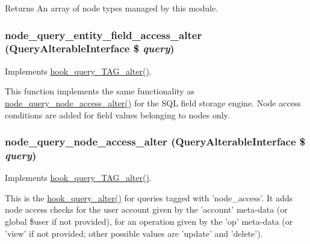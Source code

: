 \begin{DoxyReturn}{Returns}
An array of node types managed by this module. 
\end{DoxyReturn}
\hypertarget{group__node__access_gacd4162ac9ee2d2147d5212fd5e7a7319}{
\subsubsection[{node\_\-query\_\-entity\_\-field\_\-access\_\-alter}]{\setlength{\rightskip}{0pt plus 5cm}node\_\-query\_\-entity\_\-field\_\-access\_\-alter ({\bf QueryAlterableInterface} \$ {\em query})}}
\label{group__node__access_gacd4162ac9ee2d2147d5212fd5e7a7319}
Implements \hyperlink{group__hooks_ga12527037deeb76adcab1000e984fdfce}{hook\_\-query\_\-TAG\_\-alter()}.

This function implements the same functionality as \hyperlink{group__node__access_gaef7c83544718b8431d81b884ef8cc6f5}{node\_\-query\_\-node\_\-access\_\-alter()} for the SQL field storage engine. Node access conditions are added for field values belonging to nodes only. \hypertarget{group__node__access_gaef7c83544718b8431d81b884ef8cc6f5}{
\subsubsection[{node\_\-query\_\-node\_\-access\_\-alter}]{\setlength{\rightskip}{0pt plus 5cm}node\_\-query\_\-node\_\-access\_\-alter ({\bf QueryAlterableInterface} \$ {\em query})}}
\label{group__node__access_gaef7c83544718b8431d81b884ef8cc6f5}
Implements \hyperlink{group__hooks_ga12527037deeb76adcab1000e984fdfce}{hook\_\-query\_\-TAG\_\-alter()}.

This is the \hyperlink{group__hooks_gaf166f6375e9f7b5919d719eb91198d47}{hook\_\-query\_\-alter()} for queries tagged with 'node\_\-access'. It adds node access checks for the user account given by the 'account' meta-\/data (or global \$user if not provided), for an operation given by the 'op' meta-\/data (or 'view' if not provided; other possible values are 'update' and 'delete'). 